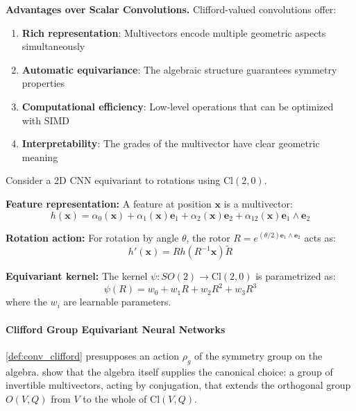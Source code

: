 \textbf{Advantages over Scalar Convolutions.}\label{rem:ventajas_clifford_conv} Clifford-valued convolutions offer:
\begin{enumerate}
    \item \textbf{Rich representation}: Multivectors encode multiple geometric aspects simultaneously
    \item \textbf{Automatic equivariance}: The algebraic structure guarantees symmetry properties
    \item \textbf{Computational efficiency}: Low-level operations that can be optimized with SIMD
    \item \textbf{Interpretability}: The grades of the multivector have clear geometric meaning
\end{enumerate}

\begin{example}\label{ex:steerable_clifford}
Consider a 2D CNN equivariant to rotations using $\text{Cl}(2,0)$.

\textbf{Feature representation:}
A feature at position $\mathbf{x}$ is a multivector:
\[h(\mathbf{x}) = \alpha_0(\mathbf{x}) + \alpha_1(\mathbf{x}) \mathbf{e}_1 + \alpha_2(\mathbf{x}) \mathbf{e}_2 + \alpha_{12}(\mathbf{x}) \mathbf{e}_1 \wedge \mathbf{e}_2\]

\textbf{Rotation action:}
For rotation by angle $\theta$, the rotor $R = e^{(\theta/2)\mathbf{e}_1 \wedge \mathbf{e}_2}$ acts as:
\[h'(\mathbf{x}) = R h(R^{-1} \mathbf{x}) \widetilde{R}\]

\textbf{Equivariant kernel:}
The kernel $\psi: SO(2) \to \text{Cl}(2,0)$ is parametrized as:
\[\psi(R) = w_0 + w_1 R + w_2 R^2 + w_3 R^3\]
where the $w_i$ are learnable parameters.
\end{example}

\paragraph{Clifford Group Equivariant Neural Networks}

\autoref{def:conv_clifford} presupposes an action $\rho_g$ of the symmetry group on the algebra. \citet{ruhe2023cliffordgroup} show that the algebra itself supplies the canonical choice: a group of invertible multivectors, acting by conjugation, that extends the orthogonal group $O(V,Q)$ from $V$ to the whole of $\text{Cl}(V,Q)$.

